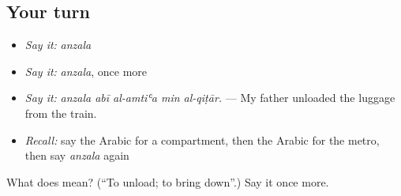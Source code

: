 \subsection*{Your turn}
\begin{itemize}
\raggedright
  \item \emph{Say it:} \emph{anzala}
  \item \emph{Say it:} \emph{anzala}, once more
  \item \emph{Say it:} \emph{anzala abī al-amtiʿa min al-qiṭār.} — My father unloaded the luggage from the train.
  \item \emph{Recall:} say the Arabic for a compartment, then the Arabic for the metro, then say \emph{anzala} again
\end{itemize}

\begin{tcolorbox}[breakable,colback=teal!4,colframe=teal!35!black,title={Before you move on}]
What does  mean? (\textquotedblleft{}To unload; to bring down\textquotedblright{}.) Say it once more.
\end{tcolorbox}
